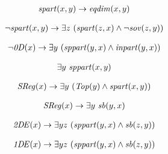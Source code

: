 \begin{erin}
    \begin{align*}
        \mathit{spart}(x,y) \to \mathit{eqdim}(x,y)
    \end{align*}
\end{erin}

\begin{erin}
    \begin{align*}
        \neg\mathit{spart}(x,y) \to \exists z\ (\mathit{spart}(z,x) \wedge \neg\mathit{sov}(z,y))
    \end{align*}
\end{erin}

\begin{erin}
    \begin{align*}
        \neg\mathit{0D}(x) \to \exists y\ (\mathit{sppart}(y,x) \wedge \mathit{inpart}(y,x))
    \end{align*}
\end{erin}
        
\begin{erin}
    \begin{align*}
        \exists y\ \mathit{sppart}(x,y)
    \end{align*}
\end{erin}

\begin{erin}
    \begin{align*}
        \mathit{S\hspace*{-0.25ex}Reg}(x) \to \exists y\ (\mathit{Top}(y) \wedge \mathit{spart}(x,y))
    \end{align*}
\end{erin}

\begin{erin}
    \begin{align*}
        \mathit{S\hspace*{-0.25ex}Reg}(x) \to \exists y\ \mathit{sb}(y,x)
    \end{align*}
\end{erin}

\begin{erin}
    \begin{align*}
        \mathit{2D\hspace*{-0.25ex} E}(x) \to \exists y z\ (\mathit{sppart}(y,x) \wedge \mathit{sb}(z,y))
    \end{align*}
\end{erin}

\begin{erin}
    \begin{align*}
        \mathit{1D\hspace*{-0.25ex} E}(x) \to \exists y z\ ( \mathit{sppart}(y,x) \wedge \mathit{sb}(z,y))
    \end{align*}
\end{erin}

